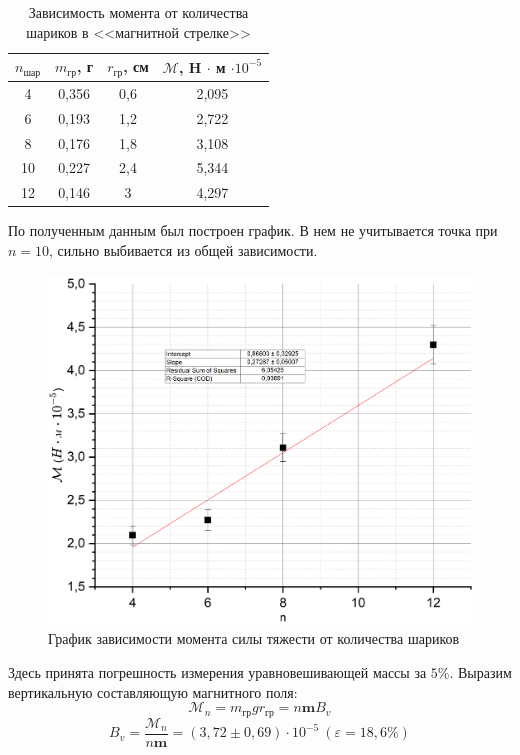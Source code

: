 \documentclass[a4paper, 12pt]{article}
\begin{document}
	\begin{table}[H]
		\centering
		\begin{tabular}{|c|c|c|c|}
			\hline $n_{\text{шар}}$ & $m_{\text{гр}}$, г & $r_{\text{гр}}$, см& $\mathcal{M}$, H $\cdot $ м $\cdot 10^{-5}$ \\ \hline 
			4 & 0,356 &  0,6 & 2,095 \\ \hline
			6 & 0,193 & 1,2 & 2,722 \\ \hline
			8 & 0,176 & 1,8 & 3,108 \\ \hline
			10 & 0,227 & 2,4 & 5,344 \\ \hline
			12 & 0,146 & 3 & 4,297 \\ \hline
		\end{tabular}
		\caption{Зависимость момента от количества шариков в <<магнитной стрелке>>}
	\end{table}
	
	По полученным данным был построен график. В нем не учитывается точка при $n = 10$, сильно выбивается из общей зависимости.
	
	\begin{figure}[H]
		\centering
		\includegraphics[width = \textwidth]{M(n)}
		\caption{График зависимости момента силы тяжести от количества шариков}
	\end{figure}
	
	Здесь принята погрешность измерения уравновешивающей массы за $5\%$. Выразим вертикальную составляющую магнитного поля:
	\[\mathcal{M}_n = m_{\text{гр}}gr_{\text{гр}} = n\mathbf{m}B_v\]
	\[B_v = \frac{\mathcal{M}_n}{n\mathbf{m}} = (3,72 \pm 0,69) \cdot 10^{-5} \ (\varepsilon = 18,6\%)\]
	
\end{document}

